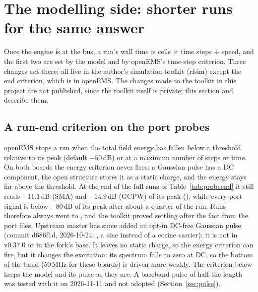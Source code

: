 \section{The modelling side: shorter runs for the same answer}\label{sec:modelling}

Once the engine is at the bus, a run's wall time is cells $\times$ time steps $\div$ speed, and the first two are
set by the model and by openEMS's time-step criterion. Three changes act there; all live in the author's simulation
toolkit (rfsim) except the end criterion, which is in openEMS. The changes made to the toolkit in this project are not
published, since the toolkit itself is private; this section and  describe them.

\subsection{A run-end criterion on the port probes}\label{sec:probeend}
openEMS stops a run when the total field energy has fallen below a threshold relative to its peak (default
$-50$\,dB) or at a maximum number of steps or time. On both boards the energy criterion never fires: a Gaussian
pulse has a DC component, the open structure stores it as a static charge, and the energy stays far above the
threshold. At the end of the full runs of Table~\ref{tab:probeend} it still reads $-11.1$\,dB (SMA) and $-14.9$\,dB
(GCPW) of its peak (), while every port signal is below $-80$\,dB of its
peak after about a quarter of the run. Runs therefore always went to , and the toolkit proved
settling after the fact from the port files. Upstream master has since added an opt-in DC-free Gaussian pulse (commit
d686f1d, 2026-10-24: , a sine instead of a cosine carrier); it is not in
v0.37.0 or in the fork's base. It leaves no static charge, so the energy criterion can fire, but it changes the
excitation: its spectrum falls to zero at DC, so the bottom of the band (50\,MHz for these boards) is driven more
weakly. The criterion below keeps the model and its pulse as they are. A baseband pulse of half the length was
tested with it on 2026-11-11 and not adopted (Section~\ref{sec:pulse}).

